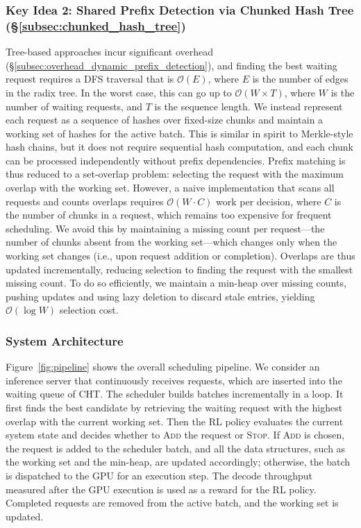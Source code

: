 \subsubsection*{Key Idea 2: Shared Prefix Detection via Chunked Hash Tree (\S\ref{subsec:chunked_hash_tree})}
Tree-based approaches incur significant overhead (\S\ref{subsec:overhead_dynamic_prefix_detection}), and finding the best waiting request requires a DFS traversal that is $\mathcal{O}(E)$, where $E$ is the number of edges in the radix tree. In the worst case, this can go up to $\mathcal{O}(W\times T)$, where $W$ is the number of waiting requests, and $T$ is the sequence length. We instead represent each request as a sequence of hashes over fixed-size chunks and maintain a working set of hashes for the active batch. This is similar in spirit to Merkle-style hash chains, but it does not require sequential hash computation, and each chunk can be processed independently without prefix dependencies. Prefix matching is thus reduced to a set-overlap problem: selecting the request with the maximum overlap with the working set. However, a naive implementation that scans all requests and counts overlaps requires $\mathcal{O}(W \cdot C)$ work per decision, where $C$ is the number of chunks in a request, which remains too expensive for frequent scheduling. We avoid this by maintaining a missing count per request—the number of chunks absent from the working set—which changes only when the working set changes (i.e., upon request addition or completion). Overlaps are thus updated incrementally, reducing selection to finding the request with the smallest missing count. To do so efficiently, we maintain a min-heap over missing counts, pushing updates and using lazy deletion to discard stale entries, yielding $\mathcal{O}(\log W)$ selection cost.

\vspace{-5pt}

\subsubsection*{System Architecture}
Figure~\ref{fig:pipeline} shows the overall scheduling pipeline. We consider an inference server that continuously receives requests, which are inserted into the waiting queue of CHT. The scheduler builds batches incrementally in a loop. It first finds the best candidate by retrieving the waiting request with the highest overlap with the current working set. Then the RL policy evaluates the current system state and decides whether to \textsc{Add} the request or \textsc{Stop}. If \textsc{Add} is chosen, the request is added to the scheduler batch, and all the data structures, such as the working set and the min-heap, are updated accordingly; otherwise, the batch is dispatched to the GPU for an execution step. The decode throughput measured after the GPU execution is used as a reward for the RL policy. Completed requests are removed from the active batch, and the working set is updated.

